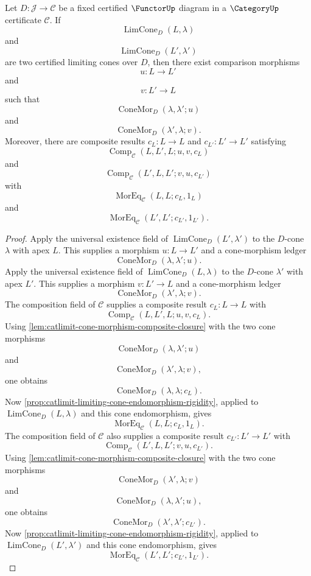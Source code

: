 \begin{theorem}\label{thm:catlimit-universal-cones-comparison-identities}
Let $D:\mathcal J\to\mathcal C$ be a fixed certified $\FunctorUp$ diagram in a $\CategoryUp$ certificate $\mathcal C$. If
$$\operatorname{LimCone}_{D}(L,\lambda)$$
and
$$\operatorname{LimCone}_{D}(L',\lambda')$$
are two certified limiting cones over $D$, then there exist comparison morphisms
$$u:L\to L'$$
and
$$v:L'\to L$$
such that
$$\operatorname{ConeMor}_{D}(\lambda,\lambda';u)$$
and
$$\operatorname{ConeMor}_{D}(\lambda',\lambda;v).$$
Moreover, there are composite results $c_L:L\to L$ and $c_{L'}:L'\to L'$ satisfying
$$\operatorname{Comp}_{\mathcal C}(L,L',L;u,v,c_L)$$
and
$$\operatorname{Comp}_{\mathcal C}(L',L,L';v,u,c_{L'})$$
with
$$\operatorname{MorEq}_{\mathcal C}(L,L;c_L,1_L)$$
and
$$\operatorname{MorEq}_{\mathcal C}(L',L';c_{L'},1_{L'}).$$
\end{theorem}
\begin{proof}
Apply the universal existence field of $\operatorname{LimCone}_{D}(L',\lambda')$ to the $D$-cone $\lambda$ with apex $L$. This supplies a morphism $u:L\to L'$ and a cone-morphism ledger
$$\operatorname{ConeMor}_{D}(\lambda,\lambda';u).$$
Apply the universal existence field of $\operatorname{LimCone}_{D}(L,\lambda)$ to the $D$-cone $\lambda'$ with apex $L'$. This supplies a morphism $v:L'\to L$ and a cone-morphism ledger
$$\operatorname{ConeMor}_{D}(\lambda',\lambda;v).$$
The composition field of $\mathcal C$ supplies a composite result $c_L:L\to L$ with
$$\operatorname{Comp}_{\mathcal C}(L,L',L;u,v,c_L).$$
Using \autoref{lem:catlimit-cone-morphism-composite-closure} with the two cone morphisms
$$\operatorname{ConeMor}_{D}(\lambda,\lambda';u)$$
and
$$\operatorname{ConeMor}_{D}(\lambda',\lambda;v),$$
one obtains
$$\operatorname{ConeMor}_{D}(\lambda,\lambda;c_L).$$
Now \autoref{prop:catlimit-limiting-cone-endomorphism-rigidity}, applied to $\operatorname{LimCone}_{D}(L,\lambda)$ and this cone endomorphism, gives
$$\operatorname{MorEq}_{\mathcal C}(L,L;c_L,1_L).$$
The composition field of $\mathcal C$ also supplies a composite result $c_{L'}:L'\to L'$ with
$$\operatorname{Comp}_{\mathcal C}(L',L,L';v,u,c_{L'}).$$
Using \autoref{lem:catlimit-cone-morphism-composite-closure} with the two cone morphisms
$$\operatorname{ConeMor}_{D}(\lambda',\lambda;v)$$
and
$$\operatorname{ConeMor}_{D}(\lambda,\lambda';u),$$
one obtains
$$\operatorname{ConeMor}_{D}(\lambda',\lambda';c_{L'}).$$
Now \autoref{prop:catlimit-limiting-cone-endomorphism-rigidity}, applied to $\operatorname{LimCone}_{D}(L',\lambda')$ and this cone endomorphism, gives
$$\operatorname{MorEq}_{\mathcal C}(L',L';c_{L'},1_{L'}).$$
\end{proof}

